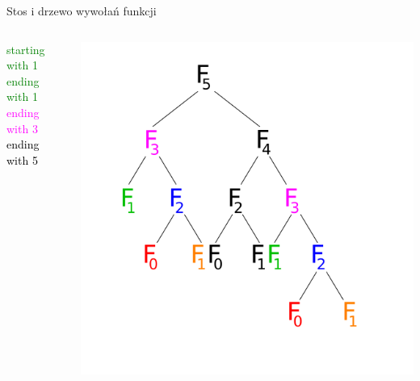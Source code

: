 \begin{frame}{Stos i drzewo wywołań funkcji}
\begin{columns}
\begin{column}{0.25\textwidth}
            \textcolor{green}{starting with 1}\\
            \textcolor{green}{ending with 1}\\
            \textcolor{magenta}{ending with 3}\\
            \textcolor{black}{ending with 5}\\
        \end{column}
        \begin{column}{0.5\textwidth}
            \includegraphics[width=\textwidth]{recursion/graphics/fibonacci_F4.png}
        \end{column}
    \end{columns}
\end{frame}
